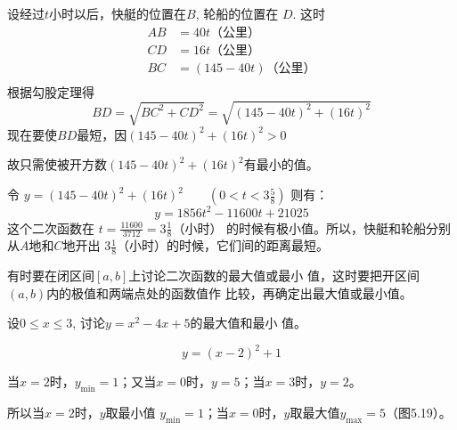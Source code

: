 \begin{solution}
    设经过$t$小时以后，快艇的位置在$B$, 轮船的位置在
$D$. 这时
\[\begin{split}
  AB&=40t \text{（公里）}\\
CD&=16t \text{（公里）}\\
BC&=(145-40t) \text{（公里）}\\  
\end{split}\]
根据勾股定理得
\[BD=\sqrt{BC^2+CD^2}=\sqrt{(145-40t)^2+(16t)^2}\]
现在要使$BD$最短，因$(145-40t)^2+(16t)^2>0$

故只需使被开方数$(145-40t)^2+(16t)^2$有最小的值。

令 $y=(145-40t)^2+(16t)^2\qquad \left(0<t<3\frac{5}{8}\right)$
则有：$$y=1856t^2-11600t+21025$$
这个二次函数在
$t=\frac{11600}{3712}=3\frac{1}{8}$（小时）
的时候有极小值。所以，快艇和轮船分别从$A$地和$C$地开出
$3\frac{1}{8}$（小时）的时候，它们间的距离最短。
\end{solution}

有时要在闭区间$[a,b]$上讨论二次函数的最大值或最小
值，这时要把开区间$(a,b)$内的极值和两端点处的函数值作
比较，再确定出最大值或最小值。


\begin{example}    
设$0\le x\le 3$, 讨论$y=x^2-4x+5$的最大值和最小
值。
\end{example}

\begin{solution}    
$$y=(x-2)^2+1$$

当$x=2$时，$y_{\min}=1$；又当$x=0$时，$y=5$；当$x=3$时，$y=2$。

所以当$x=2$时，$y$取最小值
$y_{\min}=1$；当$x=0$时，$y$取最大值$y_{\max}=5$（图5.19）。

\begin{figure}[htp]
    \centering
{}
    \caption{}
\end{figure}
\end{solution}    

